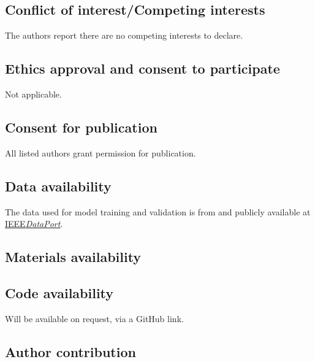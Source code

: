 \documentclass[referee, sn-mathphys-num]{sn-jnl}
\begin{document}
	\subsection*{Conflict of interest/Competing interests}
	The authors report there are no competing interests to declare.
	
	\subsection*{Ethics approval and consent to participate}
	Not applicable.
	
	\subsection*{Consent for publication}
	All listed authors grant permission for publication.
	
	\subsection*{Data availability}
	The data used for model training and validation is from \cite{PHM-dataset} and publicly available at \href{https://doi.org/10.21227/jdxd-yy51}{IEEE\textit{DataPort}}. 
	
	\subsection*{Materials availability}
	\subsection*{Code availability}
	Will be available on request, via a GitHub link.
	\subsection*{Author contribution}
	
\end{document}
